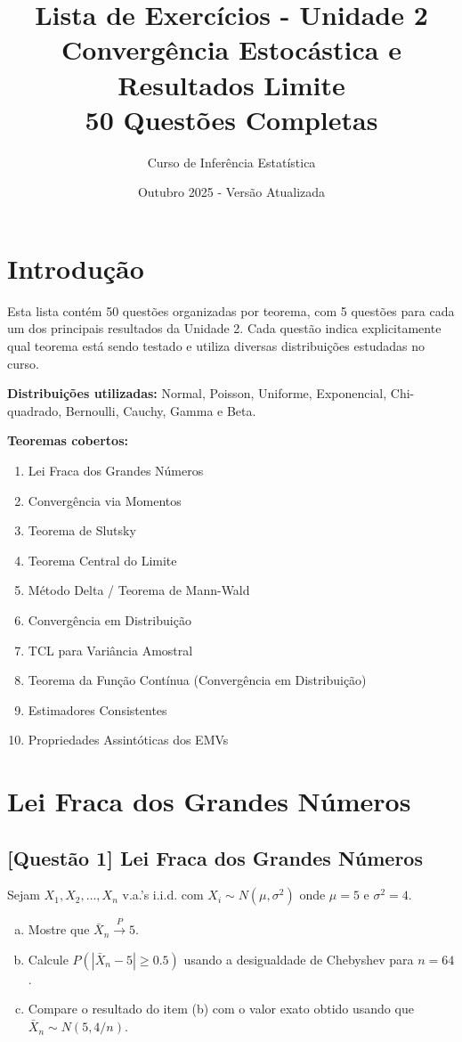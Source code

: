 \documentclass[12pt,a4paper]{article}
\title{Lista de Exercícios - Unidade 2\\
\large Convergência Estocástica e Resultados Limite\\
\normalsize 50 Questões Completas}
\author{Curso de Inferência Estatística}
\date{Outubro 2025 - Versão Atualizada}
\begin{document}
\maketitle
\tableofcontents
\newpage

\section{Introdução}

Esta lista contém 50 questões organizadas por teorema, com 5 questões para cada um dos principais resultados da Unidade 2. Cada questão indica explicitamente qual teorema está sendo testado e utiliza diversas distribuições estudadas no curso.

\textbf{Distribuições utilizadas:} Normal, Poisson, Uniforme, Exponencial, Chi-quadrado, Bernoulli, Cauchy, Gamma e Beta.

\textbf{Teoremas cobertos:}
\begin{enumerate}
    \item Lei Fraca dos Grandes Números
    \item Convergência via Momentos
    \item Teorema de Slutsky
    \item Teorema Central do Limite
    \item Método Delta / Teorema de Mann-Wald
    \item Convergência em Distribuição
    \item TCL para Variância Amostral
    \item Teorema da Função Contínua (Convergência em Distribuição)
    \item Estimadores Consistentes
    \item Propriedades Assintóticas dos EMVs
\end{enumerate}

\section{Lei Fraca dos Grandes Números}

\subsection*{[Questão 1] Lei Fraca dos Grandes Números}

Sejam $X_1, X_2, \ldots, X_n$ v.a.'s i.i.d. com $X_i \sim N(\mu, \sigma^2)$ onde $\mu = 5$ e $\sigma^2 = 4$.

\begin{enumerate}[(a)]
    \item Mostre que $\bar{X}_n \xrightarrow{P} 5$.
    \item Calcule $P(|\bar{X}_n - 5| \geq 0.5)$ usando a desigualdade de Chebyshev para $n = 64$.
    \item Compare o resultado do item (b) com o valor exato obtido usando que $\bar{X}_n \sim N(5, 4/n)$.
\end{enumerate}
\end{document}
